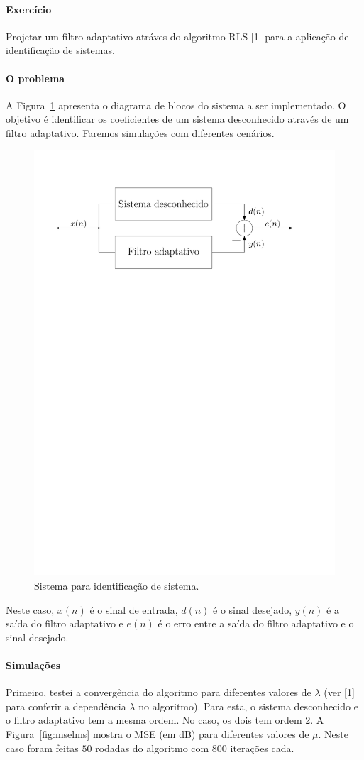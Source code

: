 \documentclass{homeworkclass}
\begin{document}
\begin{homeworkProblem}
	\paragraph{Exercício} Projetar um filtro adaptativo atráves do algoritmo RLS [1] para a aplicação de identificação de sistemas. 
	
	\paragraph{O problema}
	
	A Figura~\ref{fig:sis} apresenta o diagrama de blocos do sistema a ser implementado. O objetivo é identificar os coeficientes de um sistema desconhecido através de um filtro adaptativo. Faremos simulações com diferentes cenários. 
	\begin{figure}[!ht]
		\centering
		\includegraphics[width=0.6\linewidth]{figs/sistema}
		\caption{Sistema para identificação de sistema.}
		\label{fig:sis}
	\end{figure}

	Neste caso, $x(n)$ é o sinal de entrada, $d(n)$ é o sinal desejado, $y(n)$ é a saída do filtro adaptativo e $e(n)$ é o erro entre a saída do filtro adaptativo e o sinal desejado.
	
	\paragraph{Simulações}
	Primeiro, testei a convergência do algoritmo para diferentes valores de $\lambda$ (ver [1] para conferir a dependência $\lambda$ no algoritmo). Para esta, o sistema desconhecido e o filtro adaptativo tem a mesma ordem. No caso, os dois tem ordem 2. A Figura~\ref{fig:mselms} mostra o MSE (em dB) para diferentes valores de $\mu$. Neste caso foram feitas $50$ rodadas do algoritmo com $800$ iterações cada.
	

\end{homeworkProblem}
\end{document}

